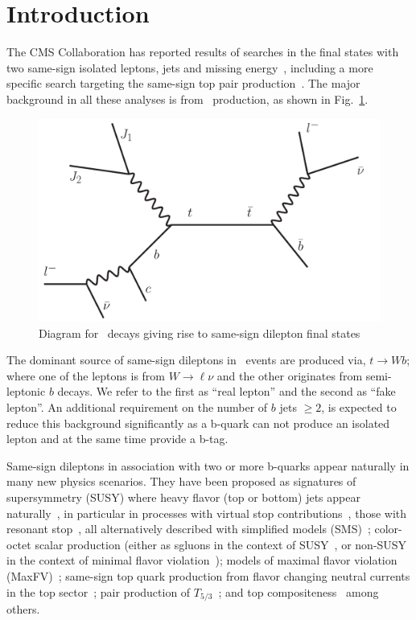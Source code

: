 \section{Introduction}
\label{sec:intro}
The CMS Collaboration has reported results of searches in the final states with two same-sign isolated leptons,
jets and missing energy~\cite{sspaper2010,ssnote2011,sspaper2011},
including a more specific search targeting the same-sign top pair production~\cite{sstop}.
The major background in all these analyses is from \ttbar\ production, as shown in Fig.~\ref{fig:ttbar}.

\begin{figure}[htb]
\begin{center}
\includegraphics[width=0.6\linewidth, height=0.35\linewidth]{figs/ttbar.pdf}
\caption{ Diagram for \ttbar\ decays giving rise to same-sign dilepton final states \label{fig:ttbar}}
\end{center}
\end{figure}

The dominant source of same-sign dileptons in \ttbar\ events are produced via, $t \rightarrow W b$; where 
one of the leptons is from $W \rightarrow \ell \nu $ and the other originates from semi-leptonic $b$ decays. 
We refer to the first as ``real lepton'' and the second as ``fake lepton''.
An additional requirement on the number of $b$ jets $\geq 2$, is expected to reduce this background significantly
as a b-quark can not produce an isolated lepton and at the same time provide a b-tag.

Same-sign dileptons in association with two or more b-quarks appear naturally in many new physics scenarios.
They have been proposed as signatures of supersymmetry 
(SUSY) where heavy flavor (top or bottom) jets appear naturally~\cite{naturalness1,naturalness2,naturalness3,naturalness4},
in particular in processes with virtual stop contributions~\cite{stopVirtual,stopVirtualPRD},
those with resonant stop~\cite{stopReal},
all alternatively described with simplified models (SMS)~\cite{wacker}; 
color-octet scalar production (either as sgluons in the context of SUSY~\cite{sgluons},
or non-SUSY in the context of minimal flavor violation~\cite{colorOctetScalars}); 
models of maximal flavor violation (MaxFV)~\cite{mxflv1,mxflv2,mxflv3}; 
same-sign top quark production from flavor changing neutral currents in the top sector~\cite{fcnczprime};
pair production of $T_{5/3}$~\cite{t53};
and top compositeness~\cite{topcomp1,topcomp2,topcomp3}
among others.

